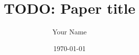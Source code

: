 \documentclass[11pt]{article}
\title{TODO: Paper title}
\author{Your Name}
\date{\today}
\begin{document}
\maketitle
\begin{abstract}
\end{abstract}






\end{document}
